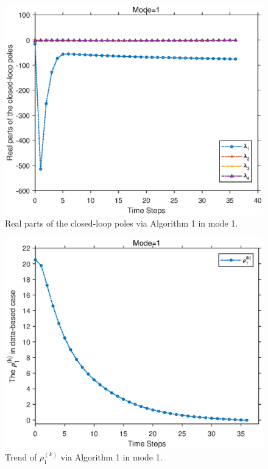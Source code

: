 \documentclass[journal]{IEEEtran}
\begin{document}
 \begin{figure} %
	\centering
	\includegraphics[scale=0.6]{mode1_eig.eps}
	\caption{Real parts of the closed-loop poles  via Algorithm 1 in mode 1.}
	\label{fig:1}
	\end{figure}


 \begin{figure} %
	\centering
	\includegraphics[scale=0.6]{rho1.eps}
	\caption{Trend of $\rho^{(k)} _{1 }$ via Algorithm 1 in mode 1.}
	\label{fig:2}
	\end{figure}
\end{document}
